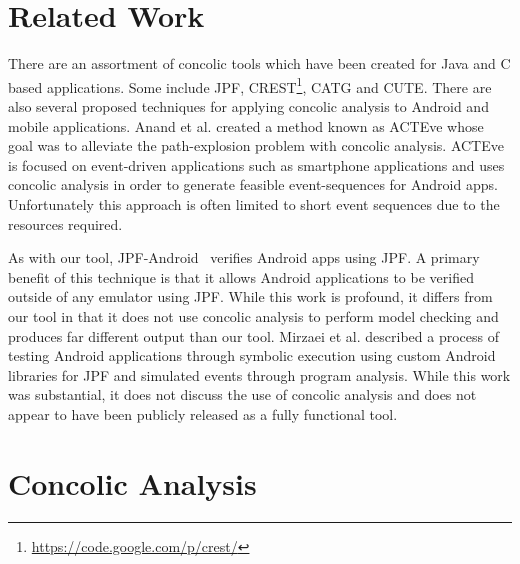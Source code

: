 \documentclass[conference]{IEEEtran}
\begin{document}
\section{Related Work}
\label{sec: relatedwork}

There are an assortment of concolic tools which have been created for Java and C based applications. Some include JPF, CREST\footnote{\url{https://code.google.com/p/crest/}}, CATG and CUTE\cite{Sen:2005:CCU:1081706.1081750}. There are also several proposed techniques for applying concolic analysis to Android and mobile applications. Anand et al.\cite{Anand:2012:ACT:2393596.2393666} created a method known as ACTEve whose goal was to alleviate the path-explosion problem with concolic analysis. ACTEve is focused on event-driven applications such as smartphone applications and uses concolic analysis in order to generate feasible event-sequences for Android apps. Unfortunately this approach is often limited to short event sequences due to the resources required.

As with our tool, JPF-Android~\cite{vanderMerwe:2014:EPS:2557833.2560576} verifies Android apps using JPF. A primary benefit of this technique is that it allows Android applications to be verified outside of any emulator using JPF. While this work is profound, it differs from our tool in that it does not use concolic analysis to perform model checking and produces far different output than our tool. Mirzaei et al.\cite{Mirzaei:2012:TAA:2382756.2382798} described a process of testing Android applications through symbolic execution using custom Android libraries for JPF and simulated events through program analysis. While this work was substantial, it does not discuss the use of concolic analysis and does not appear to have been publicly released as a fully functional tool.




\section{Concolic Analysis}
\label{sec: concolicanalysis}

\end{document}
